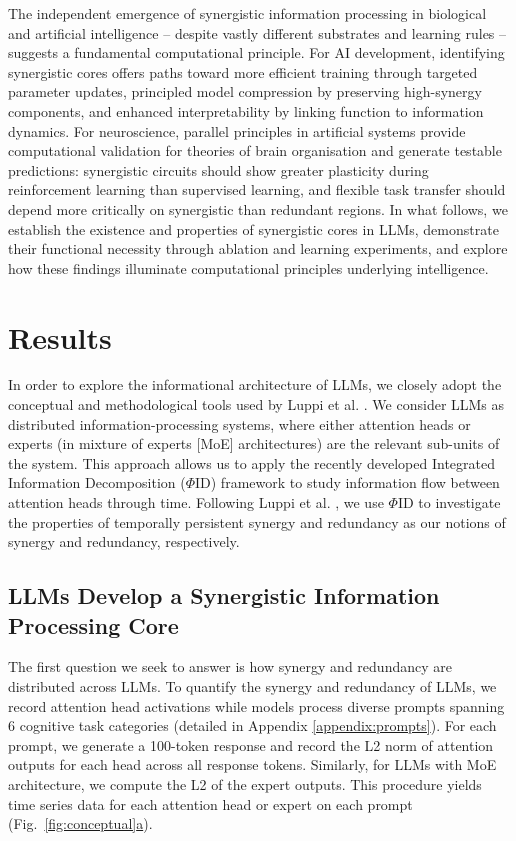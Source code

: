 \documentclass[11pt,a4paper]{ouparticle}
\newcommand\figsubref[2]{\hyperref[#1]{\ref*{#1}#2}}
\begin{document}
The independent emergence of synergistic information processing in biological and artificial intelligence -- despite vastly different substrates and learning rules -- suggests a fundamental computational principle. For AI development, identifying synergistic cores offers paths toward more efficient training through targeted parameter updates, principled model compression by preserving high-synergy components, and enhanced interpretability by linking function to information dynamics. For neuroscience, parallel principles in artificial systems provide computational validation for theories of brain organisation and generate testable predictions: synergistic circuits should show greater plasticity during reinforcement learning than supervised learning, and flexible task transfer should depend more critically on synergistic than redundant regions. In what follows, we establish the existence and properties of synergistic cores in LLMs, demonstrate their functional necessity through ablation and learning experiments, and explore how these findings illuminate computational principles underlying intelligence.



\section*{Results}\label{sec:results}

In order to explore the informational architecture of LLMs, we closely adopt the conceptual and methodological tools used by Luppi et al. \cite{luppi2022synergistic}. We consider LLMs as distributed information-processing systems, where either attention heads or experts (in mixture of experts [MoE] architectures) are the relevant sub-units of the system. This approach allows us to apply the recently developed Integrated Information Decomposition ($\Phi$ID) framework \cite{phid2021} to study information flow between attention heads through time. 
Following Luppi et al. \cite{luppi2022synergistic}, we use $\Phi$ID to investigate the properties of temporally persistent synergy and redundancy as our notions of synergy and redundancy, respectively.


\subsection*{LLMs Develop a Synergistic Information Processing Core}

The first question we seek to answer is how synergy and redundancy are distributed across LLMs. 
To quantify the synergy and redundancy of LLMs, we record attention head activations while models process diverse prompts spanning 6 cognitive task categories (detailed in Appendix \ref{appendix:prompts}). For each prompt, we generate a 100-token response and record the L2 norm of attention outputs for each head across all response tokens. Similarly, for LLMs with MoE architecture, we compute the L2 of the expert outputs. This procedure yields time series data for each attention head or expert on each prompt (Fig.~\figsubref{fig:conceptual}{a}).
\end{document}

